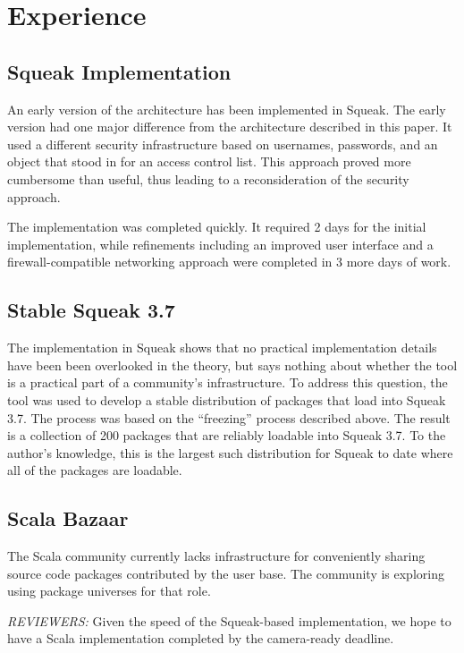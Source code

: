 \documentclass{IEEEtran}
\begin{document}
\section{Experience}
\subsection{Squeak Implementation}
An early version of the architecture has been implemented in Squeak.
The early version had one major difference from the architecture
described in this paper.  It used a different security infrastructure
based on usernames, passwords, and an object that stood in for an
access control list.  This approach proved more cumbersome than
useful, thus leading to a reconsideration of the security approach.

The implementation was completed quickly.  It required 2 days
for the initial implementation, while refinements including an
improved user interface and a firewall-compatible networking approach
were completed in 3 more days of work.


\subsection{Stable Squeak 3.7}
The implementation in Squeak shows that no practical implementation
details have been been overlooked in the theory, but says nothing
about whether the tool is a practical part of a community's
infrastructure.  To address this question, the tool was used to develop
a stable distribution of packages that load into Squeak 3.7.  The
process was based on the ``freezing'' process described above.  The
result is a collection of 200 packages that are reliably loadable into
Squeak 3.7.
To the author's knowledge, this is the largest such distribution for
Squeak to date where all of the packages are loadable.


\subsection{Scala Bazaar}
The Scala community currently lacks infrastructure for conveniently
sharing source code packages contributed by the user base.  The
community is exploring using package universes for that role.

\emph{REVIEWERS:} Given the speed of the Squeak-based
implementation, we hope to have a Scala implementation completed by the
camera-ready deadline.


\end{document}
